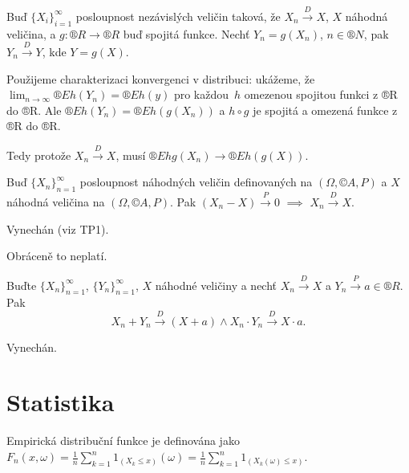 \documentclass[12pt]{article}					%
\begin{document}
\begin{lemma}
	Buď $\{X_i\}_{i=1}^∞$ posloupnost nezávislých veličin taková, že $X_n \overset{D} \rightarrow X$, $X$ náhodná veličina, a $g: ®R \rightarrow ®R$ buď spojitá funkce. Nechť $Y_n = g(X_n)$, $n \in ®N$, pak $Y_n \overset{D} \rightarrow Y$, kde $Y = g(X)$.

	\begin{dukazin}
		Použijeme charakterizaci konvergenci v distribuci: ukážeme, že $\lim_{n \rightarrow ∞} ®E h(Y_n) = ®E h(y)$ pro každou $h$ omezenou spojitou funkci z ®R do ®R. Ale $®E h(Y_n) = ®E h(g(X_n))$ a $h \circ g$ je spojitá a omezená funkce z ®R do ®R.

		Tedy protože $X_n \overset{D} \rightarrow X$, musí $®E hg(X_n) \rightarrow ®E h(g(X))$.
	\end{dukazin}

	\begin{veta}
		Buď $\{X_n\}_{n=1}^∞$ posloupnost náhodných veličin definovaných na $(\Omega, ©A, P)$ a $X$ náhodná veličina na $(\Omega, ©A, P)$. Pak $(X_n - X) \overset{P} \rightarrow 0$ $\implies$ $X_n \overset{D} \rightarrow X$.

		\begin{dukazin}
			Vynechán (viz TP1).
		\end{dukazin}

		\begin{upozorneni}
			Obráceně to neplatí.
		\end{upozorneni}
	\end{veta}

	\begin{veta}
		Buďte $\{X_n\}_{n=1}^∞$, $\{Y_n\}_{n=1}^∞$, $X$ náhodné veličiny a nechť $X_n \overset{D} \rightarrow X$ a $Y_n \overset{P} \rightarrow a \in ®R$. Pak
		$$ X_n + Y_n \overset{D} \rightarrow (X + a) \land X_n·Y_n \overset{D} \rightarrow X·a. $$

		\begin{dukazin}
			Vynechán.
		\end{dukazin}
	\end{veta}
\end{lemma}


\part{Statistika}
\begin{definice}
	Empirická distribuční funkce je definována jako $F_n(x, \omega) = \frac{1}{n} \sum_{k=1}^n 1_{(X_k ≤ x)}(\omega) = \frac{1}{n} \sum_{k=1}^n 1_{(X_k(\omega) ≤ x)}$.
\end{definice}
\end{document}

